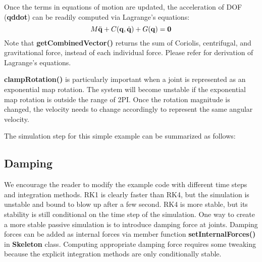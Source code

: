 Once the terms in equations of motion are updated, the acceleration of
DOF (\textbf{qddot}) can be readily computed via Lagrange's equations:
\begin{equation}
M \ddot{\mathbf{q}} + C(\mathbf{q}, \dot{\mathbf{q}}) + G(\mathbf{q}) = \mathbf{0}
\end{equation}
Note that \textbf{getCombinedVector()} returns the sum of Coriolis,
centrifugal, and gravitational force, instead of each individual
force. Please refer \cite{dynamic-tutorial} for derivation of
Lagrange's equations.

\textbf{clampRotation()} is particularly important when a joint is
represented as an exponential map rotation. The system will become
unstable if the exponential map rotation is outside the range of
2PI. Once the rotation magnitude is changed, the velocity needs to
change accordingly to represent the same angular velocity.

The simulation step for this simple example can be
summarized as follows:


\subsection{Damping}
We encourage the reader to modify the example code with different time
steps and integration methods. RK1 is clearly faster than RK4, but the
simulation is unstable and bound to blow up after a few second. RK4 is
more stable, but its stability is still conditional on the time step
of the simulation. One way to create a more stable passive simulation
is to introduce damping force at joints. Damping forces can be added
as internal forces via member function \textbf{setInternalForces()} in
\textbf{Skeleton} class. Computing appropriate damping force requires
some tweaking because the explicit integration methods are only
conditionally stable.
